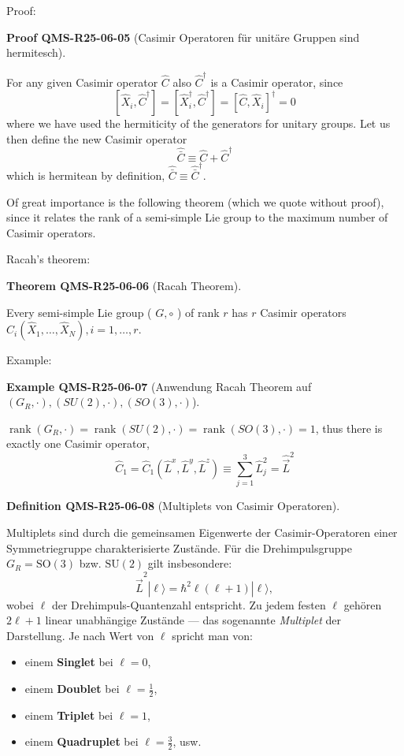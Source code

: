 \documentclass[10pt, letterpaper]{article}
\newcommand{\CustomHeading}[3]{%
  \par\medskip\noindent%
  \textbf{#1 #2} \textnormal{(#3)}.\enskip%
}
\newenvironment{DEF}[2]{\begin{unitbox}\CustomHeading{Definition}{#1}{#2}}{\end{unitbox}}
\newenvironment{THEO}[2]{\begin{unitbox}\CustomHeading{Theorem}{#1}{#2}}{\end{unitbox}}
\newenvironment{EXA}[2]{\begin{unitbox}\CustomHeading{Example}{#1}{#2}}{\end{unitbox}}
\newenvironment{PROOF}[2]{\begin{unitbox}\CustomHeading{Proof}{#1}{#2}}{\end{unitbox}}
\begin{document}
Proof: 

\begin{PROOF}{QMS-R25-06-05}{Casimir Operatoren für unitäre Gruppen sind hermitesch}
For any given Casimir operator $\hat{C}$ also $\hat{C}^{\dagger}$ is a Casimir operator, since
$$
\left[\hat{X}_{i}, \hat{C}^{\dagger}\right]=\left[\hat{X}_{i}^{\dagger}, \hat{C}^{\dagger}\right]=\left[\hat{C}, \hat{X}_{i}\right]^{\dagger}=0
$$
where we have used the hermiticity of the generators for unitary groups. Let us then define the new Casimir operator
$$
\hat{\bar{C}} \equiv \hat{C}+\hat{C}^{\dagger}
$$
which is hermitean by definition, $\hat{\bar{C}} \equiv \hat{\bar{C}}^{\dagger}$.
\end{PROOF}



Of great importance is the following theorem (which we quote without proof), since it relates the rank of a semi-simple Lie group to the maximum number of Casimir operators.


Racah's theorem: 

\begin{THEO}{QMS-R25-06-06}{Racah Theorem}
Every semi-simple Lie group ( $G, \circ$ ) of rank $r$ has $r$ Casimir operators $\hat{C}_{i}\left(\hat{X}_{1}, \ldots, \hat{X}_{N}\right), i=1, \ldots, r$.
\end{THEO}



Example: 


\begin{EXA}{QMS-R25-06-07}{Anwendung Racah Theorem auf $\left(G_{R}, \cdot\right),(S U(2), \cdot),(S O(3), \cdot)$}
$\operatorname{rank}\left(G_{R}, \cdot\right)=\operatorname{rank}(S U(2), \cdot)=\operatorname{rank}(S O(3), \cdot)=1$, thus there is exactly one Casimir operator,
$$
\hat{C}_{1}=\hat{C}_{1}\left(\hat{L}^{x}, \hat{L}^{y}, \hat{L}^{z}\right) \equiv \sum_{j=1}^{3} \hat{L}_{j}^{2}=\hat{\vec{L}}^{2}
$$
\end{EXA}



\begin{DEF}{QMS-R25-06-08}{Multiplets von Casimir Operatoren}
Multiplets sind durch die gemeinsamen Eigenwerte der Casimir-Operatoren einer Symmetriegruppe charakterisierte Zustände. Für die Drehimpulsgruppe $G_R = \mathrm{SO}(3)$ bzw. $\mathrm{SU}(2)$ gilt insbesondere:
\[
\hat{\vec{L}}^2|\ell\rangle = \hbar^2 \ell(\ell+1)|\ell\rangle,
\]
wobei $\ell$ der Drehimpuls-Quantenzahl entspricht. Zu jedem festen $\ell$ gehören $2\ell + 1$ linear unabhängige Zustände — das sogenannte \textit{Multiplet} der Darstellung. Je nach Wert von $\ell$ spricht man von:
\begin{itemize}
  \item einem \textbf{Singlet} bei $\ell = 0$,
  \item einem \textbf{Doublet} bei $\ell = \frac{1}{2}$,
  \item einem \textbf{Triplet} bei $\ell = 1$,
  \item einem \textbf{Quadruplet} bei $\ell = \frac{3}{2}$, usw.
\end{itemize}
\end{DEF}
\end{document}
